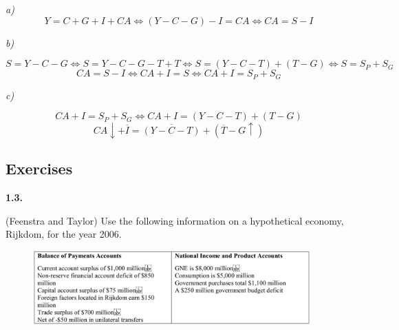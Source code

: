 \documentclass[11pt, a4paper]{article}
\begin{document}
\dotfill

\textit{a)}
$$Y = C + G + I + CA \Leftrightarrow  (Y - C - G) - I = CA \Leftrightarrow CA = S - I $$

\textit{b)}

$$ S = Y - C - G \Leftrightarrow  S = Y - C - G -T + T \Leftrightarrow S = (Y-C -T) + (T - G) \Leftrightarrow S = S_P + S_G  $$
$$ CA = S - I \Leftrightarrow  CA + I = S \Leftrightarrow CA + I= S_P + S_G $$

\textit{c)}

$$ CA + I= S_P + S_G \Leftrightarrow CA + I= (Y-C -T) + (T - G)$$
$$ CA \downarrow + \overline{I}= \overline{(Y-C -T)} + (\overline{T} - G \uparrow)$$

\clearpage

\subsection*{Exercises}

\textbf{1.3.}

(Feenstra and Taylor) Use the following information on a hypothetical economy, Rijkdom, for the year 2006.

\begin{figure}[!htb]
	\centering
	\includegraphics[width=0.95\textwidth]{img/ps01_0103.png}
\end{figure}
\end{document}
